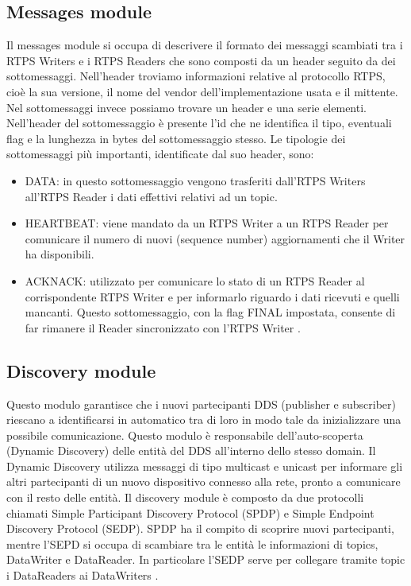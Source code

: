 \subsection{Messages module}
Il messages module si occupa di descrivere il formato dei messaggi scambiati
tra i RTPS Writers e i RTPS Readers che sono composti da un header
seguito da dei sottomessaggi. Nell'header troviamo informazioni relative al
protocollo RTPS, cioè la sua versione, il nome del vendor dell'implementazione
usata e il mittente. Nel sottomessaggi invece possiamo trovare un header
e una serie elementi. Nell'header del sottomessaggio
è presente l'id che ne
identifica il tipo, eventuali flag e la lunghezza in bytes 
del sottomessaggio stesso. Le tipologie dei sottomessaggi più importanti, 
identificate dal suo header, sono:
\begin{itemize}
    \item DATA: in questo sottomessaggio vengono trasferiti dall'RTPS Writers
    all'RTPS Reader i dati effettivi relativi ad un topic.
    \item HEARTBEAT: viene mandato da un RTPS Writer a un RTPS Reader per 
    comunicare il numero di nuovi (sequence number) aggiornamenti che il 
    Writer ha disponibili.
    \item ACKNACK: utilizzato per comunicare lo stato di un RTPS Reader 
    al corrispondente RTPS Writer e per informarlo riguardo i dati ricevuti
    e quelli mancanti. Questo sottomessaggio, con la flag FINAL 
    impostata, consente di far rimanere il Reader sincronizzato con l'RTPS
    Writer \cite{ddsrtps}.
\end{itemize} \label{Messages module}


\subsection{Discovery module}
Questo modulo garantisce che i nuovi partecipanti DDS (publisher e subscriber)
riescano a identificarsi in automatico tra di loro in modo tale da inizializzare una 
possibile comunicazione. Questo modulo è responsabile dell'auto-scoperta 
(Dynamic Discovery)
delle entità del DDS all'interno dello stesso domain. Il Dynamic Discovery
utilizza messaggi di tipo multicast e unicast per informare gli altri partecipanti
di un nuovo dispositivo connesso alla rete, pronto a comunicare con il
resto delle entità. Il discovery module è composto da due protocolli chiamati
Simple Participant Discovery Protocol (SPDP) e 
Simple Endpoint Discovery Protocol (SEDP). SPDP ha il compito di scoprire nuovi 
partecipanti, mentre l'SEPD si occupa di scambiare tra le entità le informazioni
di topics, DataWriter e DataReader. In particolare l'SEDP serve per collegare
tramite topic i DataReaders ai DataWriters \cite{ddsrtps}.
\label{Discovery module}

